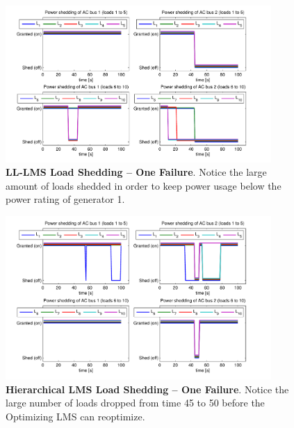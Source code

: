 \documentclass{acm_proc_article-sp}
\begin{document}
\begin{figure}[hp]
  \centering
  \includegraphics[width=0.9\textwidth]{figures/lsllonefail}
  \caption{\textbf{LL-LMS Load Shedding -- One Failure}. Notice
  the large amount of loads shedded in order to keep power usage below the power rating
  of generator 1.}
  \label{fig:lsllonefail}
\end{figure}
\begin{figure}[hp]
  \centering
  \includegraphics[width=0.9\textwidth]{figures/lsolonefail}
  \caption{\textbf{Hierarchical LMS Load Shedding -- One Failure}. Notice the
  large number of loads dropped from time 45 to 50 before the Optimizing LMS can reoptimize.}
  \label{fig:lsolonefail}
\end{figure}
\end{document}
